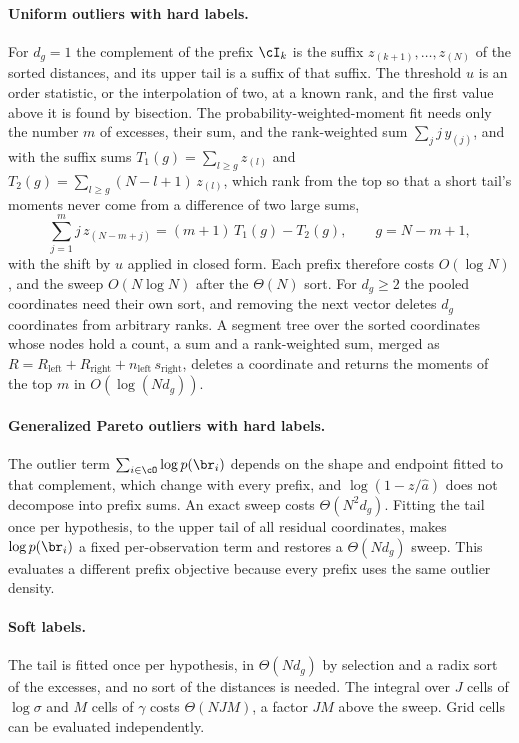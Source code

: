 \documentclass[10pt,twocolumn,letterpaper]{article}
\newcommand{\ahat}{\hat a}
\begin{document}
\paragraph{Uniform outliers with hard labels.}
For $d_g=1$ the complement of the prefix $\cI_k$ is the suffix
$z_{(k+1)},\ldots,z_{(N)}$ of the sorted distances, and its upper tail is
a suffix of that suffix. The threshold $u$ is an order statistic, or the
interpolation of two, at a known rank, and the first value above it is
found by bisection. The probability-weighted-moment fit needs only the
number $m$ of excesses, their sum, and the rank-weighted sum
$\sum_j j\,y_{(j)}$, and with the suffix sums
$T_1(g)=\sum_{l\geq g}z_{(l)}$ and $T_2(g)=\sum_{l\geq g}(N-l+1)\,z_{(l)}$,
which rank from the top so that a short tail's moments never come from a
difference of two large sums,
\begin{equation}
 \textstyle\sum_{j=1}^{m} j\,z_{(N-m+j)} = (m+1)\,T_1(g)-T_2(g),
 \qquad g=N-m+1,
 \label{eq:pwm-prefix}
\end{equation}
with the shift by $u$ applied in closed form. Each prefix therefore costs
$O(\log N)$, and the sweep $O(N\log N)$ after the $\Theta(N)$ sort. For
$d_g\geq2$ the pooled coordinates need their own sort, and removing the
next vector deletes $d_g$ coordinates from arbitrary ranks. A segment
tree over the sorted coordinates whose nodes hold a count, a sum and a
rank-weighted sum, merged as
$R=R_{\mathrm{left}}+R_{\mathrm{right}}+n_{\mathrm{left}}\,s_{\mathrm{right}}$,
deletes a coordinate and returns the moments of the top $m$ in
$O(\log(Nd_g))$.

\paragraph{Generalized Pareto outliers with hard labels.}
The outlier term $\sum_{i\in\cO}\log p(\br_i)$ depends on the shape and
endpoint fitted to that complement, which change with every prefix, and
$\log(1-z/\ahat)$ does not decompose into prefix sums. An exact sweep
costs $\Theta(N^2d_g)$. Fitting the tail once per hypothesis, to the
upper tail of all residual coordinates, makes $\log p(\br_i)$ a fixed
per-observation term and restores a $\Theta(Nd_g)$ sweep. This evaluates a different prefix objective because every prefix uses
the same outlier density.

\paragraph{Soft labels.}
The tail is fitted once per hypothesis, in $\Theta(Nd_g)$ by selection
and a radix sort of the excesses, and no sort of the distances is
needed. The integral over $J$ cells of $\log\sigma$ and $M$ cells of
$\gamma$ costs $\Theta(NJM)$, a factor $JM$ above the sweep. Grid cells can be evaluated independently.
\end{document}
